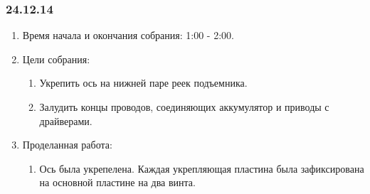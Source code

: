 \subsubsection{24.12.14}
\begin{enumerate}
	
	\item Время начала и окончания собрания: 1:00 - 2:00.
	
	\item Цели собрания: 
	\begin{enumerate}
		
	    \item Укрепить ось на нижней паре реек подъемника.
			
		\item Залудить концы проводов, соединяющих аккумулятор и приводы с драйверами.
		
	\end{enumerate}

	\item Проделанная работа:
	\begin{enumerate}
		
		\item Ось была укрепелена. Каждая укрепляющая пластина была зафиксирована на основной пластине на два винта.
		

\end{enumerate}
\end{enumerate}

